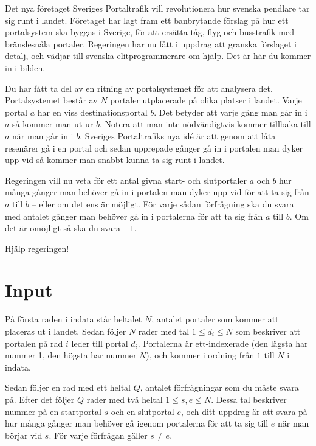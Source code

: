 
Det nya företaget Sveriges Portaltrafik vill revolutionera hur svenska
pendlare tar sig runt i landet. Företaget har lagt fram
ett banbrytande förslag på hur ett portalsystem ska byggas i Sverige, för
att ersätta tåg, flyg och busstrafik med bränslesnåla portaler. Regeringen
har nu fått i uppdrag att granska förslaget i detalj, och vädjar till
svenska elitprogrammerare om hjälp. Det är här du kommer in i bilden.

Du har fått ta del av en ritning av portalsystemet för att analysera det.
Portalsystemet består av $N$ portaler utplacerade på olika platser i landet. Varje portal $a$
har en viss destinationsportal $b$. Det betyder att varje gång man går in i $a$ så kommer man
ut ur $b$. Notera att man inte nödvändigtvis kommer tillbaka till $a$ när man går in i $b$.
Sveriges Portaltrafiks nya idé är att genom att låta resenärer gå
i en portal och sedan upprepade gånger gå in i portalen man dyker upp vid så kommer man snabbt
kunna ta sig runt i landet.

Regeringen vill nu veta för ett antal givna start- och slutportaler $a$ och $b$
hur många gånger man behöver gå in i portalen man dyker upp vid för att ta sig från $a$ till
$b$ -- eller om det ens är möjligt. För varje sådan förfrågning ska du svara med antalet
gånger man behöver gå in i portalerna för att ta sig från $a$ till $b$. Om det är omöjligt
så ska du svara $-1$.

Hjälp regeringen!

\section*{Input}

På första raden i indata står heltalet $N$, antalet portaler som kommer att placeras ut i landet.
Sedan följer $N$ rader med tal $1 \le d_i \le N$ som beskriver att portalen på rad $i$ leder till portal $d_i$.
Portalerna är ett-indexerade (den lägsta har nummer 1, den högsta har nummer $N$), och kommer i ordning från $1$ till $N$ i indata.

Sedan följer en rad med ett heltal $Q$, antalet förfrågningar som du måste svara på. Efter det
följer $Q$ rader med två heltal $1 \le s, e \le N$. Dessa tal beskriver nummer på en startportal $s$ och en
slutportal $e$, och ditt uppdrag är att svara på hur många gånger man behöver gå igenom portalerna
för att ta sig till $e$ när man börjar vid $s$. För varje förfrågan gäller $s \neq e$.

